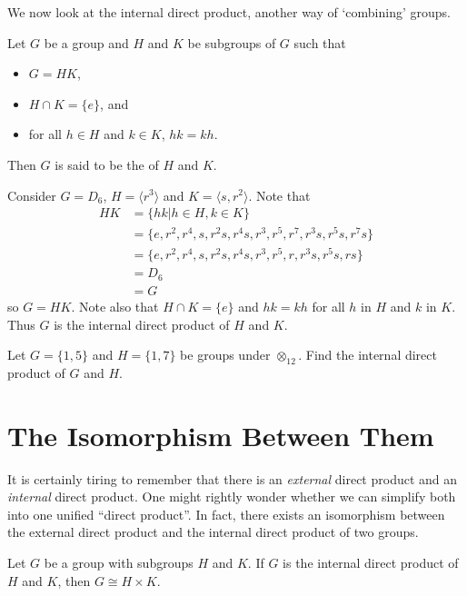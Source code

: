 We now look at the internal direct product, another way of `combining' groups.

\begin{definition}
    Let $G$ be a group and $H$ and $K$ be subgroups of $G$ such that
    \begin{itemize}
        \item $G = HK$,
        \item $H \cap K = \{e\}$, and
        \item for all $h \in H$ and $k \in K$, $hk = kh$.
    \end{itemize}
    Then $G$ is said to be the  of $H$ and $K$.
\end{definition}

\begin{example}
    Consider $G = D_6$, $H = \langle r^3 \rangle$ and $K = \langle s, r^2 \rangle$. Note that
    \begin{align*}
        HK &= \{hk \vert h \in H, k \in K\}\\
        &= \{e, r^2, r^4, s, r^2s, r^4s, r^3, r^5, r^7, r^3s, r^5s, r^7s\}\\
        &= \{e, r^2, r^4, s, r^2s, r^4s, r^3, r^5, r, r^3s, r^5s, rs\}\\
        &= D_6\\
        &= G
    \end{align*}
    so $G = HK$. Note also that $H \cap K = \{e\}$ and $hk = kh$ for all $h$ in $H$ and $k$ in $K$. Thus $G$ is the internal direct product of $H$ and $K$.
\end{example}

\begin{exercise}
    Let $G = \{1, 5\}$ and $H = \{1, 7\}$ be groups under $\otimes_{12}$. Find the internal direct product of $G$ and $H$.
\end{exercise}

\section{The Isomorphism Between Them}
It is certainly tiring to remember that there is an \textit{external} direct product and an \textit{internal} direct product. One might rightly wonder whether we can simplify both into one unified ``direct product''. In fact, there exists an isomorphism between the external direct product and the internal direct product of two groups.

\begin{theorem}\label{thrm-direct-product-equivalence}
    Let $G$ be a group with subgroups $H$ and $K$. If $G$ is the internal direct product of $H$ and $K$, then $G \cong H \times K$.
\end{theorem}

